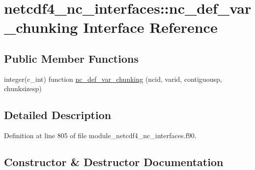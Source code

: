 \hypertarget{interfacenetcdf4__nc__interfaces_1_1nc__def__var__chunking}{}\section{netcdf4\+\_\+nc\+\_\+interfaces\+:\+:nc\+\_\+def\+\_\+var\+\_\+chunking Interface Reference}
\label{interfacenetcdf4__nc__interfaces_1_1nc__def__var__chunking}
\subsection*{Public Member Functions}
\begin{DoxyCompactItemize}
\item 
integer(c\+\_\+int) function \hyperlink{interfacenetcdf4__nc__interfaces_1_1nc__def__var__chunking_a66852eb53fd078223270b2a09953835f}{nc\+\_\+def\+\_\+var\+\_\+chunking} (ncid, varid, contiguousp, chunksizesp)
\end{DoxyCompactItemize}


\subsection{Detailed Description}


Definition at line 805 of file module\+\_\+netcdf4\+\_\+nc\+\_\+interfaces.\+f90.



\subsection{Constructor \& Destructor Documentation}
\mbox{\label{interfacenetcdf4__nc__interfaces_1_1nc__def__var__chunking_a66852eb53fd078223270b2a09953835f}} 
